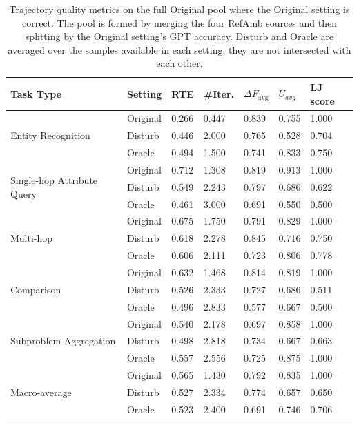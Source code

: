 \begin{table}[htbp]
\centering
\small
\caption{Trajectory quality metrics on the full Original pool where the Original setting is correct. The pool is formed by merging the four RefAmb sources and then splitting by the Original setting's GPT accuracy. Disturb and Oracle are averaged over the samples available in each setting; they are not intersected with each other.}
\begin{tabular}{lllllll}
\hline
\textbf{Task Type} & \textbf{Setting} & \textbf{RTE} & \textbf{\#Iter.} & \textbf{$\Delta F_{\text{avg}}$} & \textbf{$U_{avg}$} & \textbf{LJ score} \\
\hline
\multirow{3}{*}{Entity Recognition} & Original & 0.266 & 0.447 & 0.839 & 0.755 & 1.000 \\
 & Disturb & 0.446 & 2.000 & 0.765 & 0.528 & 0.704 \\
 & Oracle & 0.494 & 1.500 & 0.741 & 0.833 & 0.750 \\
\hline
\multirow{3}{*}{Single-hop Attribute Query} & Original & 0.712 & 1.308 & 0.819 & 0.913 & 1.000 \\
 & Disturb & 0.549 & 2.243 & 0.797 & 0.686 & 0.622 \\
 & Oracle & 0.461 & 3.000 & 0.691 & 0.550 & 0.500 \\
\hline
\multirow{3}{*}{Multi-hop} & Original & 0.675 & 1.750 & 0.791 & 0.829 & 1.000 \\
 & Disturb & 0.618 & 2.278 & 0.845 & 0.716 & 0.750 \\
 & Oracle & 0.606 & 2.111 & 0.723 & 0.806 & 0.778 \\
\hline
\multirow{3}{*}{Comparison} & Original & 0.632 & 1.468 & 0.814 & 0.819 & 1.000 \\
 & Disturb & 0.526 & 2.333 & 0.727 & 0.686 & 0.511 \\
 & Oracle & 0.496 & 2.833 & 0.577 & 0.667 & 0.500 \\
\hline
\multirow{3}{*}{Subproblem Aggregation} & Original & 0.540 & 2.178 & 0.697 & 0.858 & 1.000 \\
 & Disturb & 0.498 & 2.818 & 0.734 & 0.667 & 0.663 \\
 & Oracle & 0.557 & 2.556 & 0.725 & 0.875 & 1.000 \\
\hline
\multirow{3}{*}{Macro-average} & Original & 0.565 & 1.430 & 0.792 & 0.835 & 1.000 \\
 & Disturb & 0.527 & 2.334 & 0.774 & 0.657 & 0.650 \\
 & Oracle & 0.523 & 2.400 & 0.691 & 0.746 & 0.706 \\
\hline
\end{tabular}
\end{table}
